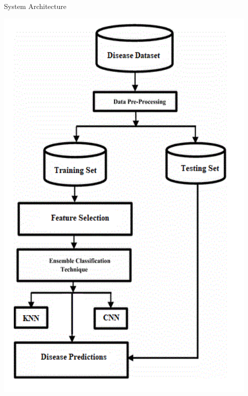 \documentclass{SKP-beamer}
\begin{document}
\begin{frame}{System Architecture}
	\begin{center}
	\includegraphics[scale=0.48]{1.png}
\end{center}
\end{frame}
\end{document}
